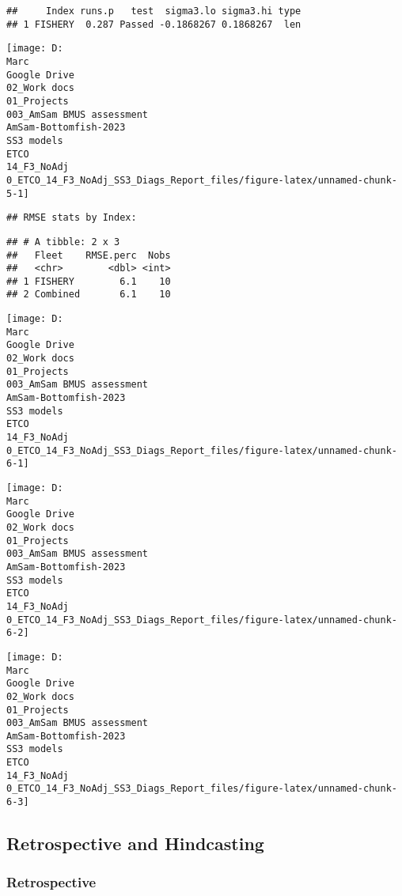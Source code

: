 \documentclass[
]{article}
\begin{document}
\begin{verbatim}
##     Index runs.p   test  sigma3.lo sigma3.hi type
## 1 FISHERY  0.287 Passed -0.1868267 0.1868267  len
\end{verbatim}

\begin{center}\texttt{[image: D:\\Marc\\Google Drive\\02\_Work docs\\01\_Projects\\003\_AmSam BMUS assessment\\AmSam-Bottomfish-2023\\SS3 models\\ETCO\\14\_F3\_NoAdj\\0\_ETCO\_14\_F3\_NoAdj\_SS3\_Diags\_Report\_files/figure-latex/unnamed-chunk-5-1]} \end{center}

\begin{verbatim}
## RMSE stats by Index:
\end{verbatim}

\begin{verbatim}
## # A tibble: 2 x 3
##   Fleet    RMSE.perc  Nobs
##   <chr>        <dbl> <int>
## 1 FISHERY        6.1    10
## 2 Combined       6.1    10
\end{verbatim}

\begin{center}\texttt{[image: D:\\Marc\\Google Drive\\02\_Work docs\\01\_Projects\\003\_AmSam BMUS assessment\\AmSam-Bottomfish-2023\\SS3 models\\ETCO\\14\_F3\_NoAdj\\0\_ETCO\_14\_F3\_NoAdj\_SS3\_Diags\_Report\_files/figure-latex/unnamed-chunk-6-1]} \end{center}

\begin{center}\texttt{[image: D:\\Marc\\Google Drive\\02\_Work docs\\01\_Projects\\003\_AmSam BMUS assessment\\AmSam-Bottomfish-2023\\SS3 models\\ETCO\\14\_F3\_NoAdj\\0\_ETCO\_14\_F3\_NoAdj\_SS3\_Diags\_Report\_files/figure-latex/unnamed-chunk-6-2]} \end{center}

\begin{center}\texttt{[image: D:\\Marc\\Google Drive\\02\_Work docs\\01\_Projects\\003\_AmSam BMUS assessment\\AmSam-Bottomfish-2023\\SS3 models\\ETCO\\14\_F3\_NoAdj\\0\_ETCO\_14\_F3\_NoAdj\_SS3\_Diags\_Report\_files/figure-latex/unnamed-chunk-6-3]} \end{center}

\hypertarget{retrospective-and-hindcasting}{%
\subsection{Retrospective and
Hindcasting}\label{retrospective-and-hindcasting}}

\hypertarget{retrospective}{%
\subsubsection{Retrospective}\label{retrospective}}
\end{document}
